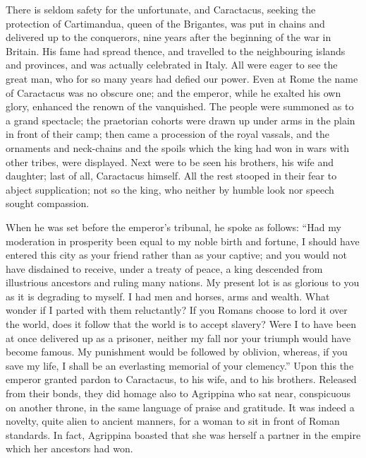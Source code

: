 
There is seldom safety for the unfortunate, and Caractacus, seeking the protection of Cartimandua, queen of the Brigantes, was put in chains and delivered up to the conquerors, nine years after the beginning of the war in Britain. His fame had spread thence, and travelled to the neighbouring islands and provinces, and was actually celebrated in Italy. All were eager to see the great man, who for so many years had defied our power. Even at Rome the name of Caractacus was no obscure one; and the emperor, while he exalted his own glory, enhanced the renown of the vanquished. The people were summoned as to a grand spectacle; the praetorian cohorts were drawn up under arms in the plain in front of their camp; then came a procession of the royal vassals, and the ornaments and neck-chains and the spoils which the king had won in wars with other tribes, were displayed. Next were to be seen his brothers, his wife and daughter; last of all, Caractacus himself. All the rest stooped in their fear to abject supplication; not so the king, who neither by humble look nor speech sought compassion.


When he was set before the emperor's tribunal, he spoke as follows: ``Had my moderation in prosperity been equal to my noble birth and fortune, I should have entered this city as your friend rather than as your captive; and you would not have disdained to receive, under a treaty of peace, a king descended from illustrious ancestors and ruling many nations. My present lot is as glorious to you as it is degrading to myself. I had men and horses, arms and wealth. What wonder if I parted with them reluctantly? If you Romans choose to lord it over the world, does it follow that the world is to accept slavery? Were I to have been at once delivered up as a prisoner, neither my fall nor your triumph would have become famous. My punishment would be followed by oblivion, whereas, if you save my life, I shall be an everlasting memorial of your clemency.'' Upon this the emperor granted pardon to Caractacus, to his wife, and to his brothers. Released from their bonds, they did homage also to Agrippina who sat near, conspicuous on another throne, in the same language of praise and gratitude. It was indeed a novelty, quite alien to ancient manners, for a woman to sit in front of Roman standards. In fact, Agrippina boasted that she was herself a partner in the empire which her ancestors had won.


